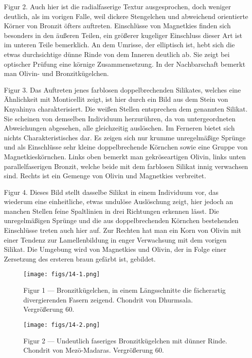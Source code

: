 \documentclass[a4paper, 11pt, oneside, polutonikogreek, german]{article}
\begin{document}
Figur 2. Auch hier ist die radialfaserige Textur ausgesprochen, doch weniger deutlich, als im vorigen Falle, weil dickere Stengelchen und abweichend orientierte Körner von Bronzit öfters auftreten. Einschlüsse von Magnetkies finden sich besonders in den äußeren Teilen, ein größerer kugeliger Einschluss dieser Art ist im unteren Teile bemerklich. An dem Umrisse, der elliptisch ist, hebt sich die etwas durchsichtige dünne Rinde von dem Inneren deutlich ab. Sie zeigt bei optischer Prüfung eine körnige Zusammensetzung. In der Nachbarschaft bemerkt man Olivin- und Bronzitkügelchen.

Figur 3. Das Auftreten jenes farblosen doppelbrechenden Silikates, welches eine Ähnlichkeit mit Monticellit zeigt, ist hier durch ein Bild aus dem Stein von Knyahinya charakterisiert. Die weißen Stellen entsprechen dem genannten Silikat. Sie scheinen von demselben Individuum herzurühren, da von untergeordneten Abweichungen abgesehen, alle gleichzeitig auslöschen. Im Ferneren bietet sich nichts Charakteristisches dar. Es zeigen sich nur krumme unregelmäßige Sprünge und als Einschlüsse sehr kleine doppelbrechende Körnchen sowie eine Gruppe von Magnetkieskörnchen. Links oben bemerkt man gekröseartigen Olivin, links unten parallelfaserigen Bronzit, welche beide mit dem farblosen Silikat innig verwachsen sind. Rechts ist ein Gemenge von Olivin und Magnetkies verbreitet.

Figur 4. Dieses Bild stellt dasselbe Silikat in einem Individuum vor, das wiederum eine einheitliche, etwas undulöse Auslöschung zeigt, hier jedoch an manchen Stellen feine Spaltlinien in drei Richtungen erkennen lässt. Die unregelmäßigen Sprünge und die aus doppelbrechenden Körnchen bestehenden Einschlüsse treten auch hier auf. Zur Rechten hat man ein Korn von Olivin mit einer Tendenz zur Lamellenbildung in enger Verwachsung mit dem vorigen Silikat. Die Umgebung wird von Magnetkies und Olivin, der in Folge einer Zersetzung des ersteren braun gefärbt ist, gebildet.
\clearpage

\vspace*{\fill}
\begin{figure}[H]
\centering
\texttt{[image: figs/14-1.png]}
\caption{\small Figur 1 --- Bronzitkügelchen, in einem Längsschnitte die fächerartig divergierenden Fasern zeigend. Chondrit von Dhurmsala. Vergrößerung 60.}
\end{figure}
\vspace*{\fill}
\clearpage

\vspace*{\fill}
\begin{figure}[H]
\centering
\texttt{[image: figs/14-2.png]}
\caption{\small Figur 2 --- Undeutlich faseriges Bronzitkügelchen mit dünner Rinde. Chondrit von Mezö-Madaras. Vergrößerung 60.}
\end{figure}
\vspace*{\fill}
\clearpage
\end{document}
